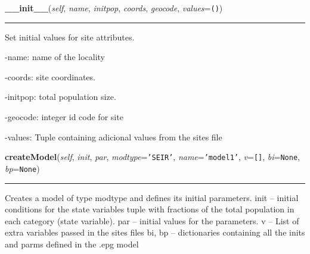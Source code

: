     \begin{boxedminipage}{\textwidth}

    \raggedright \textbf{\_\_init\_\_}(\textit{self}, \textit{name}, \textit{initpop}, \textit{coords}, \textit{geocode}, \textit{values}=\texttt{()})

    \vspace{-1.5ex}

    \rule{\textwidth}{0.5\fboxrule}
    Set initial values for site attributes.

    -name: name of the locality

    -coords: site coordinates.

    -initpop: total population size.

    -geocode: integer id code for site

    -values: Tuple containing adicional values from the sites file

    \vspace{1ex}

    \end{boxedminipage}

    \label{Epigrass:simobj:siteobj:createModel}

    \vspace{0.5ex}

    \begin{boxedminipage}{\textwidth}

    \raggedright \textbf{createModel}(\textit{self}, \textit{init}, \textit{par}, \textit{modtype}=\texttt{'SEIR'}, \textit{name}=\texttt{'model1'}, \textit{v}=\texttt{[]}, \textit{bi}=\texttt{None}, \textit{bp}=\texttt{None})

    \vspace{-1.5ex}

    \rule{\textwidth}{0.5\fboxrule}
    Creates a model of type modtype and defines its initial parameters. 
    init -- initial conditions for the state variables tuple with fractions
    of the total population in each category (state variable). par -- 
    initial values for the parameters. v -- List of extra variables passed 
    in the sites files bi, bp -- dictionaries containing all the inits and 
    parms defined in the .epg model

    \vspace{1ex}

    \end{boxedminipage}

